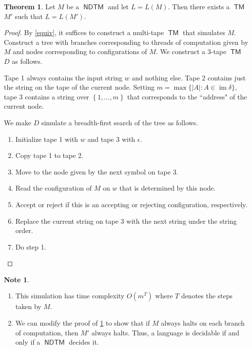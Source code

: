 \documentclass[10pt,letterpaper,cm]{nupset}
\theoremstyle{definition}
\newtheorem{note}[definition]{Note}
\theoremstyle{theorem}
\newtheorem{theorem}[definition]{Theorem}
\theoremstyle{remark}
\newcommand{\1}{\mathbf{1}}
\newcommand{\0}{\vec 0}
\DeclareMathOperator{\im}{im}
\DeclareMathOperator{\TM}{\mathsf{TM}}
\DeclareMathOperator{\NDTM}{\mathsf{NDTM}}
\begin{document}
\begin{theorem}\label{LT}
Let $M$ be a $\NDTM$ and let $L = L(M)$. Then there exists a $\TM$ $M'$ such that $L= L(M')$. 
\end{theorem}
\begin{proof}
By \cref{equiv}, it suffices to construct a multi-tape $\TM$ that simulates $M$. Construct a tree with branches corresponding to threads of computation given by $M$ and nodes corresponding to configurations of $M$. We construct a $3$-tape $\TM$ $D$ as follows. 

\medskip

 Tape 1 always contains the input string $w$ and nothing else. Tape 2 contains just the string on the tape of the current node. Setting $m = \max\{ \left\lvert{A}\right\rvert : A \in \im{\delta} \}$, tape 3 contains a string over $\left\{1, \ldots, m\right\}$ that corresponds to the ``address" of the current node. 

\medskip

 We make $D$ simulate a breadth-first search of the tree as follows. 
\begin{enumerate}
\item Initialize  tape 1 with $w$ and tape $3$ with $\epsilon$. 
\item Copy tape 1 to tape 2.
\item Move to the node given by the next symbol on tape 3.
\item Read the configuration of $M$ on $w$ that is determined by this node.
\item Accept or reject if this is an accepting or rejecting configuration, respectively. 
\item Replace the current string on tape 3 with the next string under the string order.
\item Do step 1.
\end{enumerate}
\end{proof}

\begin{note} $ $
\begin{enumerate}
\item This simulation has time complexity $O(m^T)$ where $T$ denotes the steps taken by $M$.
\item We can modify the proof of \cref{LT} to show that if $M$ always halts on each branch of computation, then $M'$ always halts. Thus, a language is decidable if and only if a $\NDTM$ decides it.
\end{enumerate}
\end{note}
\end{document}
